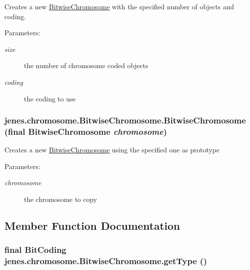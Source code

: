 Creates a new \hyperlink{classjenes_1_1chromosome_1_1_bitwise_chromosome}{BitwiseChromosome} with the specified number of objects and coding.

\begin{Desc}
\item[Parameters:]
\begin{description}
\item[{\em size}]the number of chromosome coded objects \item[{\em coding}]the coding to use \end{description}
\end{Desc}
\hypertarget{classjenes_1_1chromosome_1_1_bitwise_chromosome_90798d86b6c1871c441b562e0b1d50ca}{
\subsubsection[BitwiseChromosome]{\setlength{\rightskip}{0pt plus 5cm}jenes.chromosome.BitwiseChromosome.BitwiseChromosome (final {\bf BitwiseChromosome} {\em chromosome})}}
\label{classjenes_1_1chromosome_1_1_bitwise_chromosome_90798d86b6c1871c441b562e0b1d50ca}


Creates a new \hyperlink{classjenes_1_1chromosome_1_1_bitwise_chromosome}{BitwiseChromosome} using the specified one as prototype

\begin{Desc}
\item[Parameters:]
\begin{description}
\item[{\em chromosome}]the chromosome to copy \end{description}
\end{Desc}


\subsection{Member Function Documentation}
\hypertarget{classjenes_1_1chromosome_1_1_bitwise_chromosome_905b92cd6dc14db9d2b9276f1a6686e9}{
\subsubsection[getType]{\setlength{\rightskip}{0pt plus 5cm}final BitCoding jenes.chromosome.BitwiseChromosome.getType ()}}
\label{classjenes_1_1chromosome_1_1_bitwise_chromosome_905b92cd6dc14db9d2b9276f1a6686e9}


